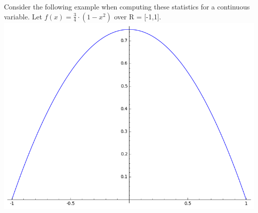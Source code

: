 \documentclass[10pt,]{book}
\theoremstyle{plain}
\theoremstyle{definition}
\theoremstyle{definition}
\theoremstyle{definition}
\numberwithin{equation}{section}
\begin{document}
	Consider the following example when computing these statistics for a continuous variable. 
	Let \(f(x) = \frac{3}{4} \cdot (1-x^2)\) over R = [-1,1].  
		\includegraphics[width=1\linewidth]{images/ContinuousDistributionExample.png}

\par
\end{document}
